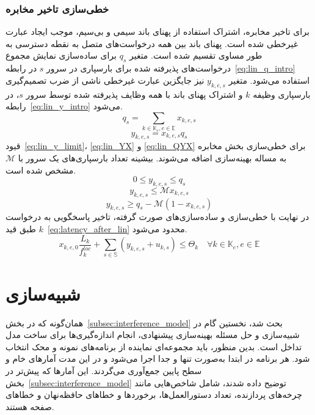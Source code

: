 \subsubsection{خطی‌سازی تاخیر مخابره}
برای تاخیر مخابره، اشتراک استفاده از پهنای باند سیمی و بی‌سیم، موجب ایجاد عبارت غیرخطی شده است. پهنای باند بین همه درخواست‌های متصل به نقطه دسترسی به طور مساوی تقسیم شده است. متغیر $q_s$ برای ساده‌سازی نمایش مجموع درخواست‌های پذیرفته شده برای بارسپاری در سرور $s$ در رابطه~\eqref{eq:lin_q_intro} استفاده می‌شود. متغیر $y_{k,e,s}$ نیز جایگزین عبارت غیرخطی ناشی از ضرب تصمیم‌گیری بارسپاری وظیفه $k$ و اشتراک پهنای باند با همه وظایف پذیرفته شده توسط سرور $s$، در رابطه~\eqref{eq:lin_y_intro} می‌شود.
\begin{equation} \label{eq:lin_q_intro}
    q_s = \sum_{k \in \mathbb{K}_e, e \in \mathbb{E}} x_{k,e,s}
\end{equation}
\begin{equation} \label{eq:lin_y_intro}
    y_{k,e,s} = x_{k,e,s} q_s
\end{equation}
قیود~\eqref{eq:lin_y_limit}، \eqref{eq:lin_YX} و \eqref{eq:lin_QYX} برای خطی‌سازی بخش مخابره به مساله بهینه‌سازی اضافه می‌شوند. بیشینه تعداد بارسپاری‌های یک سرور با $\mathcal{M}$ مشخص شده است.
\begin{equation} \label{eq:lin_y_limit}
    0 \leq y_{k,e,s} \leq q_s
\end{equation}
\begin{equation} \label{eq:lin_YX}
    y_{k,e,s} \leq \mathcal{M} x_{k,e,s}
\end{equation}
\begin{equation} \label{eq:lin_QYX}
    y_{k,e,s} \geq q_s - \mathcal{M} (1-x_{k,e,s})
\end{equation}
در نهایت با خطی‌سازی و ساده‌سازی‌های صورت گرفته، تاخیر پاسخگویی به درخواست $k$ طبق قید~\eqref{eq:latency_after_lin} محدود می‌شود.
\begin{equation} \label{eq:latency_after_lin}
    x_{k,e,0}\frac{L_k}{f^{loc}_k} + \sum_{s \in \mathbb{S}} \left(y_{k,e,s} + u_{k,s}\right) \leq \Theta_k \quad \forall k \in \mathbb{K}_e, e \in \mathbb{E}
\end{equation}

\section{شبیه‌سازی}

همان‌گونه که در بخش~\ref{subsec:interference_model} بحث شد، نخستین گام در شبیه‌سازی و حل مسئله بهینه‌سازی پیشنهادی، انجام اندازه‌گیری‌ها برای ساخت مدل تداخل است. بدین منظور، باید مجموعه‌ای نماینده از برنامه‌های نمونه و محک انتخاب شود. هر برنامه در ابتدا به‌صورت تنها و جدا اجرا می‌شود و در این مدت آمارهای خام و سطح پایین جمع‌آوری می‌گردند. این آمارها که پیش‌تر در بخش~\ref{subsec:interference_model} توضیح داده شدند، شامل شاخص‌هایی مانند چرخه‌های پردازنده، تعداد دستورالعمل‌ها، برخوردها و خطاهای حافظه‌نهان و خطاهای صفحه هستند.

